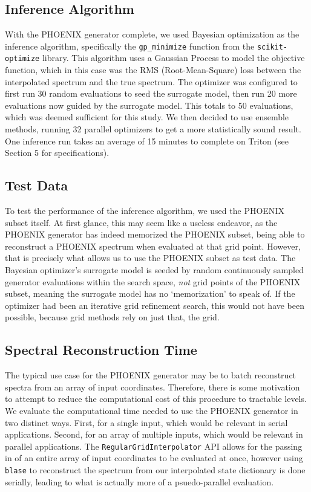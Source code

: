 \documentclass[twocolumn]{aastex631}
\begin{document}
\subsection{Inference Algorithm}
With the PHOENIX generator complete, we used Bayesian optimization as the
inference algorithm, specifically the \texttt{gp\_minimize} function from
the \texttt{scikit-optimize} library. This algorithm uses a Gaussian Process
to model the objective function, which in this case was the RMS 
(Root-Mean-Square) loss between the interpolated spectrum and the true 
spectrum. The optimizer was configured to first run 30 random evaluations to 
seed the surrogate model, then run 20 more evaluations now guided by the 
surrogate model. This totals to 50 evaluations, which was deemed sufficient 
for this study. We then decided to use ensemble methods, running 32 parallel
optimizers to get a more statistically sound result. One inference run 
takes an average of 15 minutes to complete on Triton (see Section 5 for
specifications).

\subsection{Test Data}
To test the performance of the inference algorithm, we used the PHOENIX subset
itself. At first glance, this may seem like a useless endeavor, as the 
PHOENIX generator has indeed memorized the PHOENIX subset, being able to
reconstruct a PHOENIX spectrum when evaluated at that grid point. However,
that is precisely what allows us to use the PHOENIX subset as test data.
The Bayesian optimizer's surrogate model is seeded by random continuously 
sampled generator evaluations within the search space, \textit{not} grid 
points of the PHOENIX subset, meaning the surrogate model has no `memorization' 
to speak of. If the optimizer had been an iterative grid refinement search, 
this would not have been possible, because grid methods rely on just that, 
the grid.

\subsection{Spectral Reconstruction Time}
The typical use case for the PHOENIX generator may be to batch 
reconstruct spectra from an array of input coordinates. Therefore, there
is some motivation to attempt to reduce the computational cost of this
procedure to tractable levels. We evaluate the computational time needed
to use the PHOENIX generator in two distinct ways. First, for a single
input, which would be relevant in serial applications. Second, for an array
of multiple inputs, which would be relevant in parallel applications.
The \texttt{RegularGridInterpolator} API allows for the passing in of 
an entire array of input coordinates to be evaluated at once, however 
using \texttt{blase} to reconstruct the spectrum from our interpolated
state dictionary is done serially, leading to what is actually more of 
a psuedo-parallel evaluation.
\end{document}
